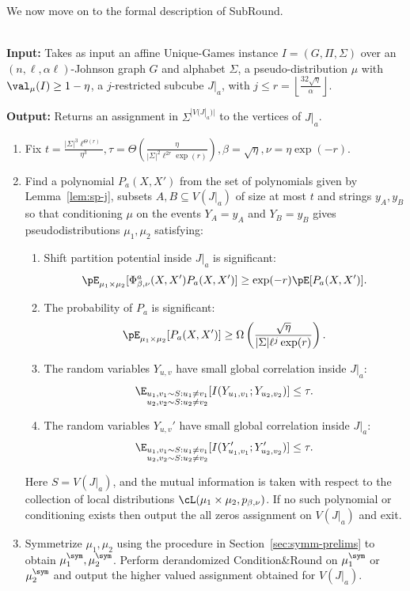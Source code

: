 \skipi
We now move on to the formal description of SubRound.
\begin{algorithm-thm}\label{alg:j-partial} ~\\
\textbf{Input:} Takes as input an affine Unique-Games instance $I = (G, \Pi, \Sigma)$ over an $(n,\ell,\alpha\ell)$-Johnson graph $G$ and alphabet $\Sigma$, a pseudo-distribution $\mu$ with $\val_\mu(I) \geq 1- \eta$, a $j$-restricted subcube $J|_a$, with $j \leq r = \left\lfloor\frac{32\sqrt{\eta}}{\alpha}\right\rfloor$. 

\noindent\textbf{Output:} Returns an assignment in $\Sigma^{|V(J|_a)|}$ to the vertices of $J|_a$. 
\begin{enumerate}
\item Fix $t = \frac{|\Sigma|^3\ell^{\Theta(r)}}{\eta^3}, \tau = \Theta(\frac{\eta}{|\Sigma|^2\ell^{2r}\exp(r)}), \beta = \sqrt{\eta}, \nu = \eta\exp(-r)$.
\item Find a polynomial $P_a(X,X')$ from the set of polynomials given by Lemma~\ref{lem:sp-j}, subsets $A, B \subseteq V(J|_a)$ of size at most $t$ and strings $y_A, y_B$ so that conditioning $\mu$ on the events $Y_A = y_A$ and $Y_B = y_B$ gives pseudodistributions $\mu_1, \mu_2$ satisfying:
\begin{enumerate}
\item 
Shift partition potential inside $J|_{a}$ is significant: 
\[
\pE_{\mu_1 \times \mu_2}[\Phi^a_{\beta,\nu}(X,X')P_a(X,X')] \geq \exp(-r) \pE[P_a(X,X')].
\]
\item The probability of $P_a$ is significant:
\[
\pE_{\mu_1 \times \mu_2}[P_a(X,X')] \geq \Omega\left(\frac{\sqrt{\eta}}{|\Sigma|\ell^{j}\exp(r)}\right).
\]
\item The random variables $Y_{u,v}$ have small global correlation inside $J|_a$: 
\[\E_{\substack{u_1,v_1 \sim S: u_1 \neq v_1\\ u_2,v_2 \sim S: u_2 \neq v_2}}[I(Y_{u_1,v_1};Y_{u_2,v_2})] \leq \tau.
\]
\item The random variables $Y_{u,v}'$ have small global correlation inside $J|_a$: \[
\E_{\substack{u_1,v_1 \sim S: u_1 \neq v_1\\ u_2,v_2 \sim S: u_2 \neq v_2}}[I(Y'_{u_1,v_1};Y'_{u_2,v_2})] \leq \tau.
\]
\end{enumerate}
Here $S = V(J|_a)$, and the mutual information is taken with respect to the collection of local distributions $\cL(\mu_1 \times \mu_2,p_{\beta,\nu})$. If no such polynomial or conditioning exists then output the all zeros assignment on $V(J|_a)$ and exit.
\item Symmetrize $\mu_1, \mu_2$ using the procedure in Section~\ref{sec:symm-prelims} to obtain $\mu^{\sym}_1, \mu^{\sym}_2$. Perform derandomized Condition\&Round on $\mu^{\sym}_1$ or $\mu^{\sym}_2$ and output the higher valued assignment obtained for $V(J|_a)$.
\end{enumerate}
\end{algorithm-thm}



